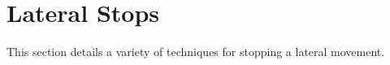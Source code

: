 \section{Lateral Stops}

This section details a variety of techniques for stopping a lateral movement.
